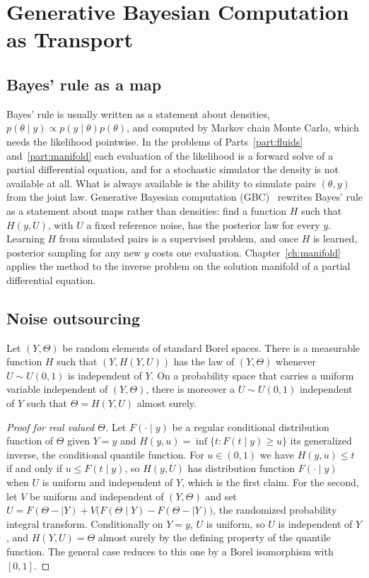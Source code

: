 \chapter{Generative Bayesian Computation as Transport}
\label{ch:gbc}

\section{Bayes' rule as a map}

Bayes' rule is usually written as a statement about densities, $p(\theta\mid y)\propto p(y\mid\theta)p(\theta)$, and computed by Markov chain Monte Carlo, which needs the likelihood pointwise. In the problems of Parts~\ref{part:fluids} and~\ref{part:manifold} each evaluation of the likelihood is a forward solve of a partial differential equation, and for a stochastic simulator the density is not available at all. What is always available is the ability to simulate pairs $(\theta,y)$ from the joint law. Generative Bayesian computation (GBC)~\cite{polsonsokolov2025,polsonruggerisokolov2024} rewrites Bayes' rule as a statement about maps rather than densities: find a function $H$ such that $H(y,U)$, with $U$ a fixed reference noise, has the posterior law for every $y$. Learning $H$ from simulated pairs is a supervised problem, and once $H$ is learned, posterior sampling for any new $y$ costs one evaluation. Chapter~\ref{ch:manifold} applies the method to the inverse problem on the solution manifold of a partial differential equation.

\section{Noise outsourcing}

\begin{theorem}
\label{thm:outsourcing}
Let $(Y,\Theta)$ be random elements of standard Borel spaces. There is a measurable function $H$ such that $(Y,H(Y,U))$ has the law of $(Y,\Theta)$ whenever $U\sim U(0,1)$ is independent of $Y$. On a probability space that carries a uniform variable independent of $(Y,\Theta)$, there is moreover a $U\sim U(0,1)$ independent of $Y$ such that $\Theta = H(Y,U)$ almost surely.
\end{theorem}

\begin{proof}[Proof for real valued $\Theta$]
Let $F(\cdot\mid y)$ be a regular conditional distribution function of $\Theta$ given $Y = y$ and $H(y,u) = \inf\{t:F(t\mid y)\geq u\}$ its generalized inverse, the conditional quantile function. For $u\in(0,1)$ we have $H(y,u)\leq t$ if and only if $u\leq F(t\mid y)$, so $H(y,U)$ has distribution function $F(\cdot\mid y)$ when $U$ is uniform and independent of $Y$, which is the first claim. For the second, let $V$ be uniform and independent of $(Y,\Theta)$ and set $U = F(\Theta-\mid Y)+V\big(F(\Theta\mid Y)-F(\Theta-\mid Y)\big)$, the randomized probability integral transform. Conditionally on $Y = y$, $U$ is uniform, so $U$ is independent of $Y$, and $H(Y,U) = \Theta$ almost surely by the defining property of the quantile function. The general case reduces to this one by a Borel isomorphism with $[0,1]$.
\end{proof}

